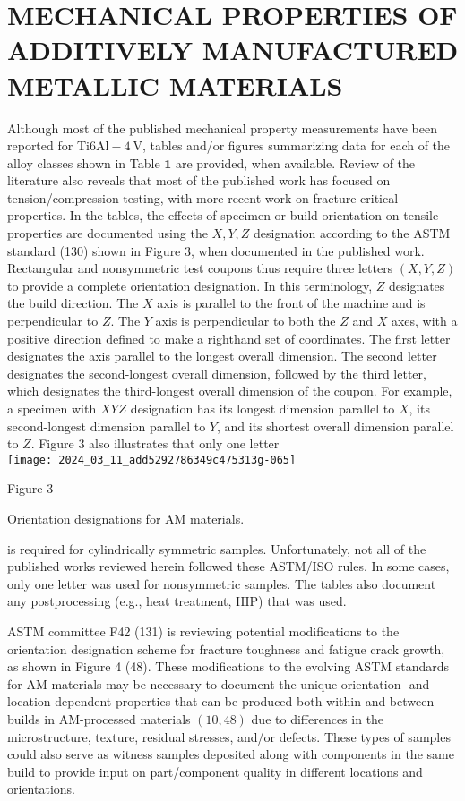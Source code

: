 \documentclass[10pt]{article}
\begin{document}
\section*{MECHANICAL PROPERTIES OF ADDITIVELY MANUFACTURED METALLIC MATERIALS}
Although most of the published mechanical property measurements have been reported for Ti$6 \mathrm{Al}-4 \mathrm{~V}$, tables and/or figures summarizing data for each of the alloy classes shown in Table $\mathbf{1}$ are provided, when available. Review of the literature also reveals that most of the published work has focused on tension/compression testing, with more recent work on fracture-critical properties. In the tables, the effects of specimen or build orientation on tensile properties are documented using the $X, Y, Z$ designation according to the ASTM standard (130) shown in Figure 3, when documented in the published work. Rectangular and nonsymmetric test coupons thus require three letters $(X, Y, Z)$ to provide a complete orientation designation. In this terminology, $Z$ designates the build direction. The $X$ axis is parallel to the front of the machine and is perpendicular to $Z$. The $Y$ axis is perpendicular to both the $Z$ and $X$ axes, with a positive direction defined to make a righthand set of coordinates. The first letter designates the axis parallel to the longest overall dimension. The second letter designates the second-longest overall dimension, followed by the third letter, which designates the third-longest overall dimension of the coupon. For example, a specimen with $X Y Z$ designation has its longest dimension parallel to $X$, its second-longest dimension parallel to $Y$, and its shortest overall dimension parallel to $Z$. Figure 3 also illustrates that only one letter\\
\texttt{[image: 2024\_03\_11\_add5292786349c475313g-065]}

Figure 3

Orientation designations for AM materials.

is required for cylindrically symmetric samples. Unfortunately, not all of the published works reviewed herein followed these ASTM/ISO rules. In some cases, only one letter was used for nonsymmetric samples. The tables also document any postprocessing (e.g., heat treatment, HIP) that was used.

ASTM committee F42 (131) is reviewing potential modifications to the orientation designation scheme for fracture toughness and fatigue crack growth, as shown in Figure 4 (48). These modifications to the evolving ASTM standards for AM materials may be necessary to document the unique orientation- and location-dependent properties that can be produced both within and between builds in AM-processed materials $(10,48)$ due to differences in the microstructure, texture, residual stresses, and/or defects. These types of samples could also serve as witness samples deposited along with components in the same build to provide input on part/component quality in different locations and orientations.
\end{document}

